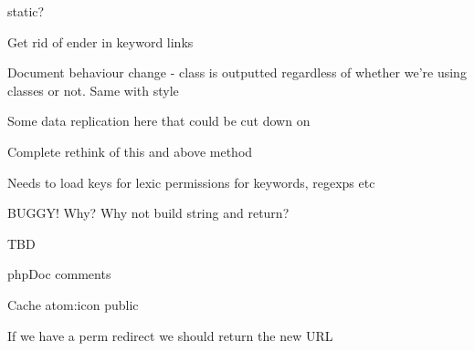 \begin{DoxyRefList}
static?  
\item[\label{todo__todo000015}%
\hypertarget{todo__todo000015}{}%
Member \hyperlink{class_ge_s_hi_ac805e25b3d3b98e56721d1b3923695a1}{Ge\-S\-Hi\-:\-:handle\-\_\-keyword\-\_\-replace} (\$match)]Get rid of ender in keyword links  
\item[\label{todo__todo000018}%
\hypertarget{todo__todo000018}{}%
Member \hyperlink{class_ge_s_hi_a1bc16b5dd7819813f8b8ba1ba0408ccb}{Ge\-S\-Hi\-:\-:header} ()]Document behaviour change -\/ class is outputted regardless of whether we're using classes or not. Same with style  
\item[\label{todo__todo000014}%
\hypertarget{todo__todo000014}{}%
Member \hyperlink{class_ge_s_hi_ae1b0545f4143201ac3055abc0854196d}{Ge\-S\-Hi\-:\-:highlight\-\_\-lines\-\_\-extra} (\$lines, \$style=null)]Some data replication here that could be cut down on  
\item[\label{todo__todo000012}%
\hypertarget{todo__todo000012}{}%
Member \hyperlink{class_ge_s_hi_ad78f694615e13053f89adffc2071250b}{Ge\-S\-Hi\-:\-:load\-\_\-from\-\_\-file} (\$file\-\_\-name, \$lookup=array())]Complete rethink of this and above method  
\item[\label{todo__todo000017}%
\hypertarget{todo__todo000017}{}%
Member \hyperlink{class_ge_s_hi_a7597671dc76f5140b3762e79d8bfd7ec}{Ge\-S\-Hi\-:\-:load\-\_\-language} (\$file\-\_\-name)]Needs to load keys for lexic permissions for keywords, regexps etc  
\item[\label{todo__todo000016}%
\hypertarget{todo__todo000016}{}%
Member \hyperlink{class_ge_s_hi_aa48862b4146192a1e3553bbdb0720e74}{Ge\-S\-Hi\-:\-:parse\-\_\-non\-\_\-string\-\_\-part} (\$stuff\-\_\-to\-\_\-parse)]B\-U\-G\-G\-Y! Why? Why not build string and return?  
\item[\label{todo__todo000053}%
\hypertarget{todo__todo000053}{}%
Member \hyperlink{class_settings_ae96281d10c45bb31246f025e4fbde6c6}{Settings\-:\-:platform\-File} (const std\-::string \&filename)]T\-B\-D  
\item[\label{todo__todo000019}%
\hypertarget{todo__todo000019}{}%
Namespace \hyperlink{namespace_simple_pie}{Simple\-Pie} ]php\-Doc comments  
\item[\label{todo__todo000022}%
\hypertarget{todo__todo000022}{}%
Member \hyperlink{class_simple_pie_ad9ae2195c6464085b4ffe58d83b4bac7}{Simple\-Pie\-:\-:get\-\_\-favicon} ()]Cache atom\-:icon  public  
\item[\label{todo__todo000023}%
\hypertarget{todo__todo000023}{}%
Member \hyperlink{class_simple_pie_a128eeaeb14bdc6e246ba2e0bf655be9a}{Simple\-Pie\-:\-:subscribe\-\_\-url} ()]If we have a perm redirect we should return the new U\-R\-L 


\end{DoxyRefList}
